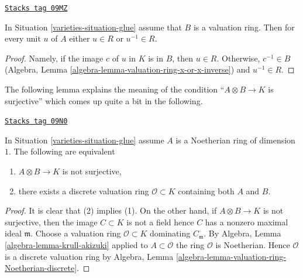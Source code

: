 \begin{lemma}
\label{varieties-lemma-glue-valuation-ring}
\href{https://stacks.math.columbia.edu/tag/09MZ}{\texttt{Stacks tag 09MZ}}

In Situation \ref{varieties-situation-glue} assume that $B$ is a valuation ring.
Then for every unit $u$ of $A$ either $u \in R$ or $u^{-1} \in R$.
\end{lemma}

\begin{proof}
Namely, if the image $c$ of $u$ in $K$ is in $B$, then $u \in R$.
Otherwise, $c^{-1} \in B$
(Algebra, Lemma \ref{algebra-lemma-valuation-ring-x-or-x-inverse})
and $u^{-1} \in R$.
\end{proof}

The following lemma explains the meaning of the condition
``$A \otimes B \to K$ is surjective'' which comes up quite
a bit in the following.

\begin{lemma}
\label{varieties-lemma-glue-separated}
\href{https://stacks.math.columbia.edu/tag/09N0}{\texttt{Stacks tag 09N0}}

In Situation \ref{varieties-situation-glue} assume $A$ is a Noetherian
ring of dimension $1$. The following are equivalent
\begin{enumerate}
\item $A \otimes B \to K$ is not surjective,
\item there exists a discrete valuation ring $\mathcal{O} \subset K$
containing both $A$ and $B$.
\end{enumerate}
\end{lemma}

\begin{proof}
It is clear that (2) implies (1). On the other hand, if $A \otimes B \to K$
is not surjective, then the image $C \subset K$ is not a field hence
$C$ has a nonzero maximal ideal $\mathfrak m$. Choose a valuation ring
$\mathcal{O} \subset K$ dominating $C_\mathfrak m$. By
Algebra, Lemma \ref{algebra-lemma-krull-akizuki} applied to
$A \subset \mathcal{O}$ the ring $\mathcal{O}$ is Noetherian.
Hence $\mathcal{O}$ is a discrete valuation ring by
Algebra, Lemma \ref{algebra-lemma-valuation-ring-Noetherian-discrete}.
\end{proof}

